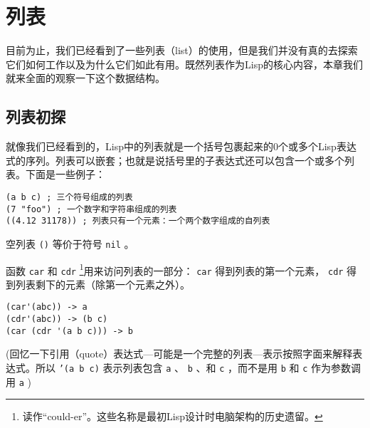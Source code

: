 \chapter{列表}
\label{chapter:06-Lists}


目前为止，我们已经看到了一些列表（list）的使用，但是我们并没有真的去探索它们如何工作以及为什么它们如此有用。既然列表作为Lisp的核心内容，本章我们就来全面的观察一下这个数据结构。

\section{列表初探}
\label{section:06-The-Simple-View-of-Lists}

就像我们已经看到的，Lisp中的列表就是一个括号包裹起来的0个或多个Lisp表达式的序列。列表可以嵌套；也就是说括号里的子表达式还可以包含一个或多个列表。下面是一些例子：

\begin{verbatim}
(a b c) ; 三个符号组成的列表
(7 "foo") ; 一个数字和字符串组成的列表
((4.12 31178)) ; 列表只有一个元素：一个两个数字组成的自列表
\end{verbatim}

空列表 \texttt{()} 等价于符号 \texttt{nil} 。

函数 \texttt{car} 和 \texttt{cdr} \footnote{读作“could-er”。这些名称是最初Lisp设计时电脑架构的历史遗留。}用来访问列表的一部分： \texttt{car} 得到列表的第一个元素， \texttt{cdr} 得到列表剩下的元素（除第一个元素之外）。

\begin{verbatim}
(car'(abc)) -> a
(cdr'(abc)) -> (b c)
(car (cdr '(a b c))) -> b
\end{verbatim}

(回忆一下引用（quote）表达式---可能是一个完整的列表---表示按照字面来解释表达式。所以 \texttt{'(a b c)} 表示列表包含 \texttt{a} 、 \texttt{b} 、和 \texttt{c} ，而不是用 \texttt{b} 和 \texttt{c} 作为参数调用 \texttt{a} )

